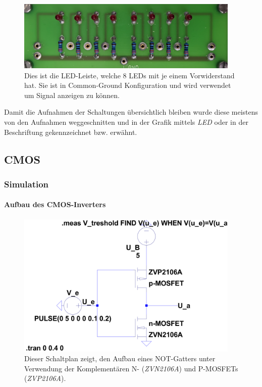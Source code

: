 \documentclass[12pt,english,ngerman]{scrartcl}
\begin{document}
\begin{figure}[H]
  \centering
  \includegraphics[width=0.95\textwidth]{./figures/messungen/ledleiste.jpg}
  \caption{Dies ist die LED-Leiste, welche 8 LEDs mit je einem Vorwiderstand
  hat. Sie ist in Common-Ground Konfiguration und wird verwendet um Signal
  anzeigen zu können.}
  \label{fig:aufbau_led}
\end{figure}

Damit die Aufnahmen der Schaltungen übersichtlich bleiben wurde diese meistens
von den Aufnahmen weggeschnitten und in der Grafik mittels \textit{LED} oder in
der Beschriftung gekennzeichnet bzw. erwähnt.

\subsection{CMOS}
\subsubsection{Simulation}
\paragraph{Aufbau des CMOS-Inverters}


\begin{figure}[H]
  \centering
    \includegraphics[width=0.95\textwidth]{./simdaten_lab/cmos/inverter/schaltung.png}
    \caption{Dieser Schaltplan zeigt, den Aufbau eines NOT-Gatters unter
    Verwendung der Komplementären N- (\textit{ZVN2106A}) und P-MOSFETs
    (\textit{ZVP2106A}).}
  \label{fig:sim_aufbau_inv}
\end{figure}
\end{document}

